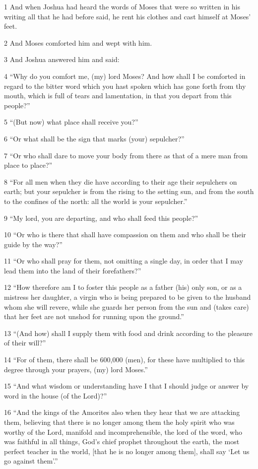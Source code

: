 \par 1 And when Joshua had heard the words of Moses that were so written in his writing all that he had before said, he rent his clothes and cast himself at Moses' feet.
\par 2 And Moses comforted him and wept with him.
\par 3 And Joshua answered him and said:
\par 4 “Why do you comfort me, (my) lord Moses? And how shall I be comforted in regard to the bitter word which you hast spoken which has gone forth from thy mouth, which is full of tears and lamentation, in that you depart from this people?”
\par 5 “(But now) what place shall receive you?”
\par 6 “Or what shall be the sign that marks (your) sepulcher?”
\par 7 “Or who shall dare to move your body from there as that of a mere man from place to place?”
\par 8 “For all men when they die have according to their age their sepulchers on earth; but your sepulcher is from the rising to the setting sun, and from the south to the confines of the north: all the world is your sepulcher.”
\par 9 “My lord, you are departing, and who shall feed this people?”
\par 10 “Or who is there that shall have compassion on them and who shall be their guide by the way?”
\par 11 “Or who shall pray for them, not omitting a single day, in order that I may lead them into the land of their forefathers?”
\par 12 “How therefore am I to foster this people as a father (his) only son, or as a mistress her daughter, a virgin who is being prepared to be given to the husband whom she will revere, while she guards her person from the sun and (takes care) that her feet are not unshod for running upon the ground.”
\par 13 “(And how) shall I supply them with food and drink according to the pleasure of their will?”
\par 14 “For of them, there shall be 600,000 (men), for these have multiplied to this degree through your prayers, (my) lord Moses.”
\par 15 “And what wisdom or understanding have I that I should judge or answer by word in the house (of the Lord)?”
\par 16 “And the kings of the Amorites also when they hear that we are attacking them, believing that there is no longer among them the holy spirit who was worthy of the Lord, manifold and incomprehensible, the lord of the word, who was faithful in all things, God's chief prophet throughout the earth, the most perfect teacher in the world, [that he is no longer among them], shall say ‘Let us go against them’.”
